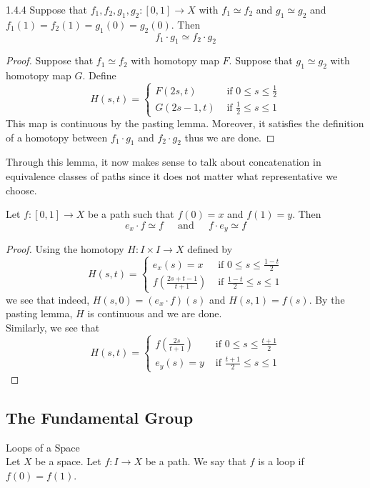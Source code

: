 \documentclass[a4paper]{article}
\begin{document}
\begin{lmm}{}{1.4.4} Suppose that $f_1,f_2,g_1,g_2:[0,1]\to X$ with $f_1\simeq f_2$ and $g_1\simeq g_2$ and $f_1(1)=f_2(1)=g_1(0)=g_2(0)$. Then $$f_1\cdot g_1\simeq f_2\cdot g_2$$ 
\begin{proof}
Suppose that $f_1\simeq f_2$ with homotopy map $F$. Suppose that $g_1\simeq g_2$ with homotopy map $G$. Define $$H(s,t)=\begin{cases}
F(2s,t) & \text{ if } 0\leq s\leq\frac{1}{2}\\
G(2s-1,t) & \text{ if } \frac{1}{2}\leq s\leq 1
\end{cases}$$
This map is continuous by the pasting lemma. Moreover, it satisfies the definition of a homotopy between $f_1\cdot g_1$ and $f_2\cdot g_2$ thus we are done. 
\end{proof}
\end{lmm}

Through this lemma, it now makes sense to talk about concatenation in equivalence classes of paths since it does not matter what representative we choose. 

\begin{prp}{}{} Let $f:[0,1]\to X$ be a path such that $f(0)=x$ and $f(1)=y$. Then $$e_x\cdot f\simeq f\;\;\;\;\text{ and }\;\;\;\;f\cdot e_y\simeq f$$ 
\begin{proof}
Using the homotopy $H:I\times I\to X$ defined by $$H(s,t)=\begin{cases}
e_x(s)=x & \text{ if } 0\leq s\leq\frac{1-t}{2}\\
f\left(\frac{2s+t-1}{t+1}\right) & \text{ if }\frac{1-t}{2}\leq s\leq 1
\end{cases}$$ we see that indeed, $H(s,0)=(e_x\cdot f)(s)$ and $H(s,1)=f(s)$. By the pasting lemma, $H$ is continuous and we are done. \\
Similarly, we see that $$H(s,t)=\begin{cases}
f\left(\frac{2s}{t+1}\right) & \text{ if } 0\leq s\leq\frac{t+1}{2}\\
e_y(s)=y & \text{ if } \frac{t+1}{2}\leq s\leq 1
\end{cases}$$
\end{proof}
\end{prp}

\subsection{The Fundamental Group}
\begin{defn}{Loops of a Space}{}\\
Let $X$ be a space. Let $f:I\to X$ be a path. We say that $f$ is a loop if $f(0)=f(1)$. 
\end{defn}
\end{document}
